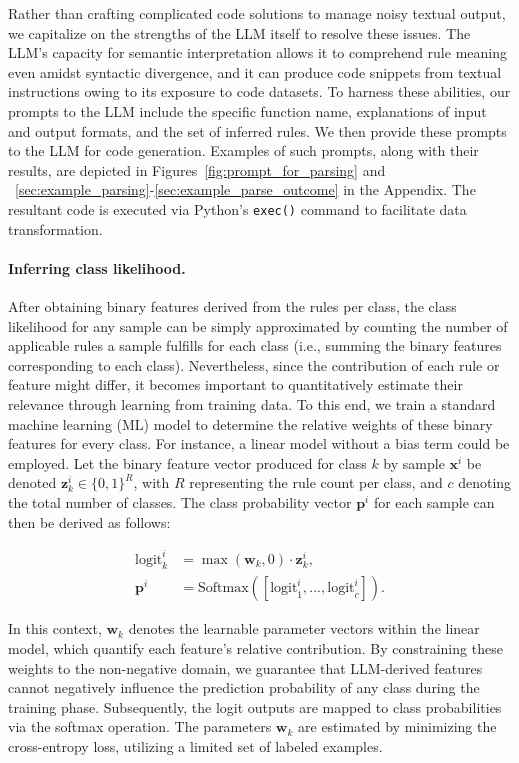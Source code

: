 Rather than crafting complicated code solutions to manage noisy textual output, we capitalize on the strengths of the LLM itself to resolve these issues. The LLM’s capacity for semantic interpretation allows it to comprehend rule meaning even amidst syntactic divergence, and it can produce code snippets from textual instructions owing to its exposure to code datasets. To harness these abilities, our prompts to the LLM include the specific function name, explanations of input and output formats, and the set of inferred rules. We then provide these prompts to the LLM for code generation. Examples of such prompts, along with their results, are depicted in Figures~\ref{fig:prompt_for_parsing} and ~\ref{sec:example_parsing}-\ref{sec:example_parse_outcome} in the Appendix. The resultant code is executed via Python’s \texttt{exec()} command to facilitate data transformation.

\vspace*{-0.12in}
\paragraph{Inferring class likelihood.} After obtaining binary features derived from the rules per class, the class likelihood for any sample can be simply approximated by counting the number of applicable rules a sample fulfills for each class (i.e., summing the binary features corresponding to each class). Nevertheless, since the contribution of each rule or feature might differ, it becomes important to quantitatively estimate their relevance through learning from training data. To this end, we train a standard machine learning (ML) model to determine the relative weights of these binary features for every class. For instance, a linear model without a bias term could be employed. Let the binary feature vector produced for class $k$ by sample $\mathbf{x}^i$ be denoted $\mathbf{z}_k^i \in \{0, 1\}^R$, with $R$ representing the rule count per class, and $c$ denoting the total number of classes. The class probability vector $\mathbf{p}^i$ for each sample can then be derived as follows:

\begin{align}
\text{logit}_k^i &= \max(\mathbf{w}_k, 0) \cdot \mathbf{z}_k^i, \nonumber \\
\mathbf{p}^i &= \text{Softmax}({[\text{logit}_{1}^i, ..., \text{logit}_{c}^i]}). \label{eq:infer_prob}
\end{align}

In this context, $\mathbf{w}_k$ denotes the learnable parameter vectors within the linear model, which quantify each feature's relative contribution. By constraining these weights to the non-negative domain, we guarantee that LLM-derived features cannot negatively influence the prediction probability of any class during the training phase. Subsequently, the logit outputs are mapped to class probabilities via the softmax operation. The parameters $\mathbf{w}_k$ are estimated by minimizing the cross-entropy loss, utilizing a limited set of labeled examples.

